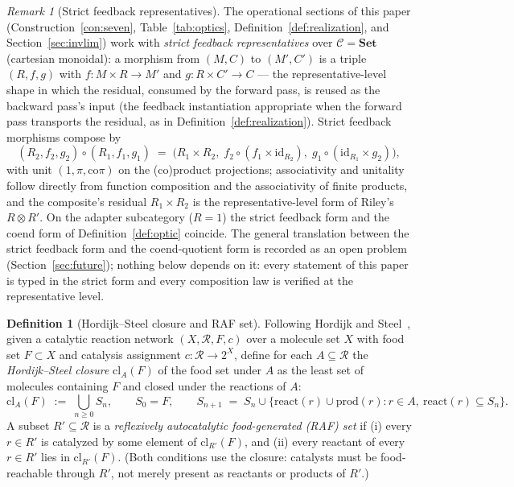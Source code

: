 \documentclass[11pt,a4paper]{article}
\theoremstyle{plain}
\theoremstyle{definition}
\newtheorem{definition}[theorem]{Definition}
\theoremstyle{remark}
\newtheorem{remark}[theorem]{Remark}
\newcommand{\CC}{\mathcal{C}}
\begin{document}
\begin{remark}[Strict feedback representatives]
\label{rem:optic-strict}
The operational sections of this paper
(Construction~\ref{con:seven}, Table~\ref{tab:optics},
Definition~\ref{def:realization}, and
Section~\ref{sec:invlim}) work with \emph{strict feedback
representatives} over $\CC = \mathbf{Set}$ (cartesian monoidal): a
morphism from $(M, C)$ to $(M', C')$ is a triple $(R, f, g)$ with
$f : M \times R \to M'$ and $g : R \times C' \to C$ --- the
representative-level shape in which the residual, consumed by the
forward pass, is reused as the backward pass's input (the feedback
instantiation appropriate when the forward pass transports the
residual, as in Definition~\ref{def:realization}). Strict feedback
morphisms compose by
\begin{equation}\label{eq:feedback-comp}
  (R_2, f_2, g_2) \circ (R_1, f_1, g_1)
  \;=\; \bigl(R_1 \times R_2,\;
  f_2 \circ (f_1 \times \mathrm{id}_{R_2}),\;
  g_1 \circ (\mathrm{id}_{R_1} \times g_2)\bigr),
\end{equation}
with unit $(1, \pi, \mathrm{co}\pi)$ on the (co)product projections;
associativity and unitality follow directly from function
composition and the associativity of finite products, and the
composite's residual $R_1 \times R_2$ is the representative-level
form of Riley's $R \otimes R'$. On the adapter subcategory
($R = 1$) the strict feedback form and the coend form of
Definition~\ref{def:optic} coincide. The general translation
between the strict feedback form and the coend-quotient form is
recorded as an open problem (Section~\ref{sec:future}); nothing
below depends on it: every statement of this paper is typed in the
strict form and every composition law is verified at the
representative level.
\end{remark}

\begin{definition}[Hordijk--Steel closure and RAF set]
\label{def:raf}
Following Hordijk and Steel~\cite{steel2004,hordijk2011}, given a
catalytic reaction network $(X, \mathcal{R}, F, c)$ over a molecule set
$X$ with food set $F\subset X$ and catalysis assignment $c:\mathcal{R}
\to 2^X$, define for each $A\subseteq\mathcal{R}$ the
\emph{Hordijk--Steel closure} $\mathrm{cl}_{A}(F)$ of the food set
under $A$ as the least set of molecules containing $F$ and closed
under the reactions of $A$:
\begin{equation}\label{eq:hs-closure}
  \mathrm{cl}_{A}(F) \;:=\; \bigcup_{n\geq 0} S_{n}, \qquad
  S_{0}=F,\qquad
  S_{n+1} \;=\; S_{n}\cup\bigl\{\mathrm{react}(r)\cup\mathrm{prod}(r):
  r\in A,\ \mathrm{react}(r)\subseteq S_{n}\bigr\}.
\end{equation}
A subset $R'\subseteq\mathcal{R}$ is a \emph{reflexively
autocatalytic food-generated (RAF) set} if (i) every $r\in R'$ is
catalyzed by some element of $\mathrm{cl}_{R'}(F)$, and (ii) every
reactant of every $r\in R'$ lies in $\mathrm{cl}_{R'}(F)$. (Both
conditions use the closure: catalysts must be food-reachable through
$R'$, not merely present as reactants or products of $R'$.)
\end{definition}
\end{document}
